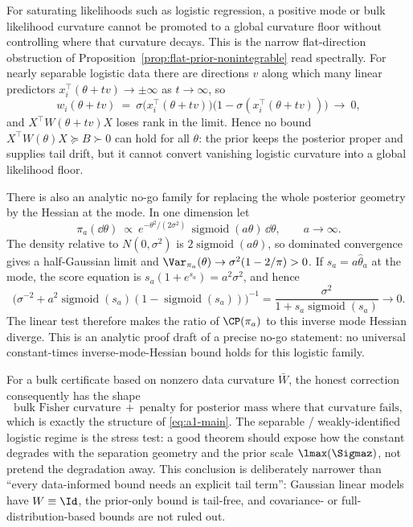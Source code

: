 \documentclass[../../main.tex]{subfiles}
\begin{document}
For saturating likelihoods such as logistic regression, a positive mode or bulk likelihood
curvature cannot be promoted to a global curvature floor without controlling where that curvature
decays. This is the narrow flat-direction obstruction of
Proposition~\ref{prop:flat-prior-nonintegrable} read spectrally. For nearly separable logistic data
there are directions $v$
along which many linear predictors $x_i^\top(\theta+tv)\to\pm\infty$ as $t\to\infty$, so
\[
  w_i(\theta+tv)\ =\ \sigma\big(x_i^\top(\theta+tv)\big)\big(1-\sigma(x_i^\top(\theta+tv))\big)\ \to\ 0,
\]
and $X^\top W(\theta+tv)X$ loses rank in the limit. Hence no bound $X^\top W(\theta)X\succeq
B\succ0$ can hold for all $\theta$: the prior keeps the posterior proper and supplies tail drift,
but it cannot convert vanishing logistic curvature into a global likelihood floor.

There is also an analytic no-go family for replacing the whole posterior geometry by the Hessian
at the mode. In one dimension let
\[
  \pi_a(\dd\theta)\ \propto\
  e^{-\theta^2/(2\sigma^2)}\,\operatorname{sigmoid}(a\theta)\,\dd\theta,
  \qquad a\to\infty.
\]
The density relative to $N(0,\sigma^2)$ is $2\operatorname{sigmoid}(a\theta)$, so dominated
convergence gives a half-Gaussian limit and
$\Var_{\pi_a}(\theta)\to\sigma^2(1-2/\pi)>0$. If
$s_a=a\hat\theta_a$ at the mode, the score equation is
$s_a(1+e^{s_a})=a^2\sigma^2$, and hence
\[
 \big(\sigma^{-2}+a^2\operatorname{sigmoid}(s_a)
       (1-\operatorname{sigmoid}(s_a))\big)^{-1}
 =\frac{\sigma^2}{1+s_a\operatorname{sigmoid}(s_a)}\longrightarrow0.
\]
The linear test therefore makes the ratio of $\CP(\pi_a)$ to this inverse mode Hessian diverge.
This is an analytic proof draft of a precise no-go statement: no universal constant-times
inverse-mode-Hessian bound holds for this logistic family.

For a bulk certificate based on nonzero data curvature $\bar W$, the honest correction
consequently has the shape
\[
  \text{bulk Fisher curvature}\ +\ \text{penalty for posterior mass where that curvature fails},
\]
which is exactly the structure of \eqref{eq:a1-main}. The separable / weakly-identified logistic
regime is the stress test: a good theorem should expose how the constant degrades with the
separation geometry and the prior scale $\lmax(\Sigmaz)$, not pretend the degradation away.
This conclusion is deliberately narrower than ``every data-informed bound needs an explicit tail
term'': Gaussian linear models have $W\equiv\Id$, the prior-only bound is tail-free, and
covariance- or full-distribution-based bounds are not ruled out.
\end{document}
